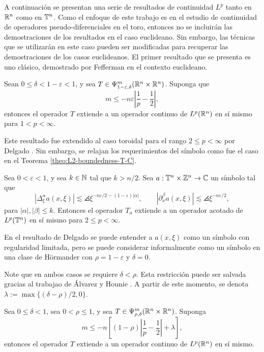 A continuación se presentan una serie de resultados de continuidad $L^p$ tanto en $\mathbb{R}^n$ como en $\mathbb{T}^n$. Como el enfoque de este trabajo es en el estudio de continuidad de operadores pseudo-diferenciales en el toro, entonces no se incluirán las demostraciones de los resultados en el caso euclideano. Sin embargo, las técnicas que se utilizarán en este caso pueden ser modificadas para recuperar las demostraciones de los casos euclideanos. El primer resultado que se presenta es uno clásico, demostrado por Fefferman \cite{fefferman-Lp} en el contexto euclideano. 
\begin{theorem}[Fefferman]
	Sean $0\leq\delta<1-\varepsilon<1$, y sea $T\in \Psi^m_{1-\varepsilon, \delta}(\mathbb{R}^n\times\mathbb{R}^n)$. Suponga que 
	\begin{equation*}
		m \leq - n\varepsilon\left|\frac{1}{p} - \frac{1}{2}\right|,
	\end{equation*}
	entonces el operador $T$ extiende a un operador continuo de $L^p(\mathbb{R}^n)$ en sí mismo para $1<p<\infty$.
\end{theorem} 
Este resultado fue extendido al caso toroidal para el rango $2\leq p<\infty$ por Delgado \cite{delgado}. Sin embargo, se relajan los requerimientos del símbolo como fue el caso en el Teorema \ref{theo:L2-boundedness-T-C}.
\begin{theorem}[Delgado]
	Sea $0<\varepsilon<1$, y sea $k\in\mathbb{N}$ tal que $k>n/2$. Sea $a:\mathbb{T}^n\times\mathbb{Z}^n\to\mathbb{C}$ un símbolo tal que 
	\begin{equation*}
		|\Delta^\alpha_\xi a(x, \xi)| \lesssim \angles{\xi}^{-n\varepsilon/2-(1-\varepsilon)|\alpha|}, \quad \quad |\partial^\beta_x a(x, \xi)| \lesssim \angles{\xi}^{-n\varepsilon/2},
	\end{equation*}
	para $|\alpha|,|\beta|\leq k$. Entonces el operador $T_a$ extiende a un operador acotado de $L^p(\mathbb{T}^n)$ en sí mismo para $2\leq p<\infty$.
\end{theorem}
\begin{remark}
	En el resultado de Delgado se puede entender a $a(x, \xi)$ como un símbolo con regularidad limitada, pero se puede considerar informalmente como un símbolo en una clase de H\"ormander con $\rho=1-\varepsilon$ y $\delta=0$.
\end{remark}
Note que en ambos casos se requiere $\delta < \rho$. Esta restricción puede ser salvada gracias al trabajao de \'Alvarez y Hounie \cite{alvarez-hounie}. A partir de este momento, se denota $\lambda := \max\{(\delta - \rho)/2, 0\}$.
\begin{theorem}\label{theo:Alvarez-Hounie}
	Sea $0\leq\delta<1$, sea $0<\rho\leq1$, y sea $T\in\Psi^m_{\rho, \delta}(\mathbb{R}^n\times\mathbb{R}^n)$. Suponga 
	\begin{equation*}
		m \leq -n \left[(1-\rho)\left|\frac{1}{p} - \frac{1}{2}\right|+\lambda\right],
	\end{equation*}
	entonces el operador $T$ extiende a un operador continuo de $L^p(\mathbb{R}^n)$ en sí mismo. 
\end{theorem}
